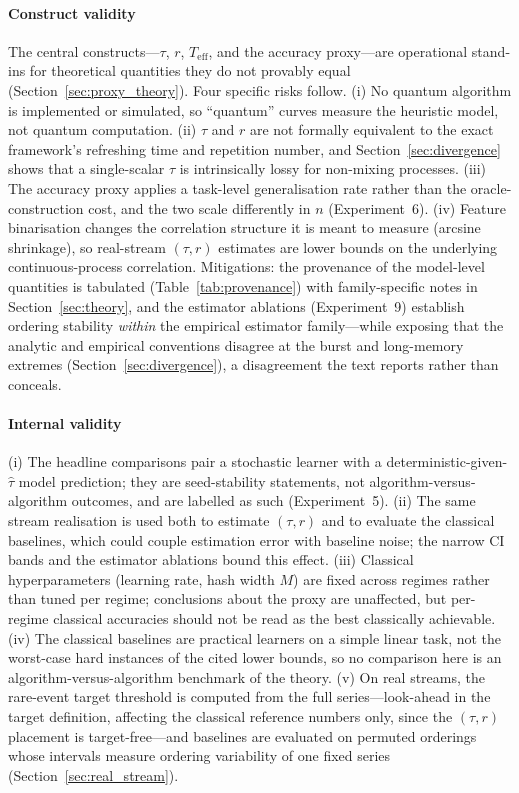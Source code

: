 \documentclass[sensors,article,submit,pdftex,moreauthors]{Definitions/mdpi}
\newcommand{\Teff}{T_{\mathrm{eff}}}
\begin{document}
\paragraph{Construct validity} The central constructs---$\tau$, $r$, $\Teff$, and the accuracy proxy---are operational stand-ins for theoretical quantities they do not provably equal (Section~\ref{sec:proxy_theory}). Four specific risks follow. (i) No quantum algorithm is implemented or simulated, so ``quantum'' curves measure the heuristic model, not quantum computation. (ii) $\tau$ and $r$ are not formally equivalent to the exact framework's refreshing time and repetition number, and Section~\ref{sec:divergence} shows that a single-scalar $\tau$ is intrinsically lossy for non-mixing processes. (iii) The accuracy proxy applies a task-level generalisation rate rather than the oracle-construction cost, and the two scale differently in $n$ (Experiment~6). (iv) Feature binarisation changes the correlation structure it is meant to measure (arcsine shrinkage), so real-stream $(\tau, r)$ estimates are lower bounds on the underlying continuous-process correlation. Mitigations: the provenance of the model-level quantities is tabulated (Table~\ref{tab:provenance}) with family-specific notes in Section~\ref{sec:theory}, and the estimator ablations (Experiment~9) establish ordering stability \emph{within} the empirical estimator family---while exposing that the analytic and empirical conventions disagree at the burst and long-memory extremes (Section~\ref{sec:divergence}), a disagreement the text reports rather than conceals.

\paragraph{Internal validity} (i) The headline comparisons pair a stochastic learner with a deterministic-given-$\hat{\tau}$ model prediction; they are seed-stability statements, not algorithm-versus-algorithm outcomes, and are labelled as such (Experiment~5). (ii) The same stream realisation is used both to estimate $(\tau, r)$ and to evaluate the classical baselines, which could couple estimation error with baseline noise; the narrow CI bands and the estimator ablations bound this effect. (iii) Classical hyperparameters (learning rate, hash width $M$) are fixed across regimes rather than tuned per regime; conclusions about the proxy are unaffected, but per-regime classical accuracies should not be read as the best classically achievable. (iv) The classical baselines are practical learners on a simple linear task, not the worst-case hard instances of the cited lower bounds, so no comparison here is an algorithm-versus-algorithm benchmark of the theory. (v) On real streams, the rare-event target threshold is computed from the full series---look-ahead in the target definition, affecting the classical reference numbers only, since the $(\tau, r)$ placement is target-free---and baselines are evaluated on permuted orderings whose intervals measure ordering variability of one fixed series (Section~\ref{sec:real_stream}).
\end{document}
